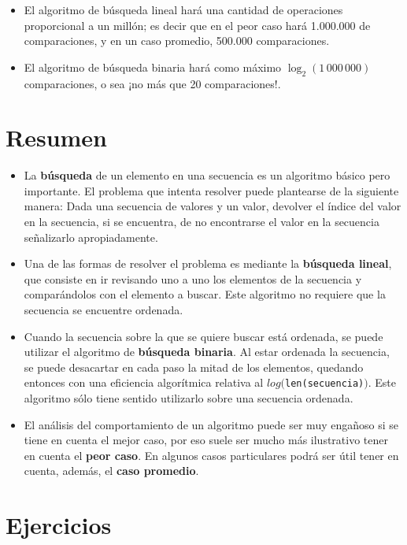 \begin{itemize}
\item El algoritmo de búsqueda lineal hará una cantidad de operaciones proporcional
a un millón; es decir que en el peor caso hará 1.000.000 de comparaciones, y en
un caso promedio, 500.000 comparaciones.
\item El algoritmo de búsqueda binaria hará como máximo $\log_2(1\,000\,000)$
comparaciones, o sea ¡no más que 20 comparaciones!.
\end{itemize}

\section{Resumen}

\begin{itemize}

\item La {\bf búsqueda} de un elemento en una secuencia es un
algoritmo básico pero importante. El problema que intenta resolver puede
plantearse de la siguiente manera: Dada una secuencia de valores y un
valor, devolver el índice del valor en la secuencia, si se encuentra, de no
encontrarse el valor en la secuencia señalizarlo apropiadamente.

\item Una de las formas de resolver el problema es mediante la {\bf
búsqueda lineal}, que consiste en ir revisando uno a uno los elementos de
la secuencia y comparándolos con el elemento a buscar.  Este algoritmo no
requiere que la secuencia se encuentre ordenada.

\item Cuando la secuencia sobre la que se quiere buscar está ordenada, se
puede utilizar el algoritmo de {\bf búsqueda binaria}.  Al estar ordenada
la secuencia, se puede desacartar en cada paso la mitad de los elementos,
quedando entonces con una eficiencia algorítmica relativa al
$log($\lstinline!len(secuencia)!$)$. Este algoritmo sólo tiene sentido
utilizarlo sobre una secuencia ordenada.

\item El análisis del comportamiento de un algoritmo puede ser muy engañoso
si se tiene en cuenta el mejor caso, por eso suele ser mucho más
ilustrativo tener en cuenta el {\bf peor caso}.  En algunos casos
particulares podrá ser útil tener en cuenta, además, el {\bf caso
promedio}.
\end{itemize}


\newpage
\section{Ejercicios}

